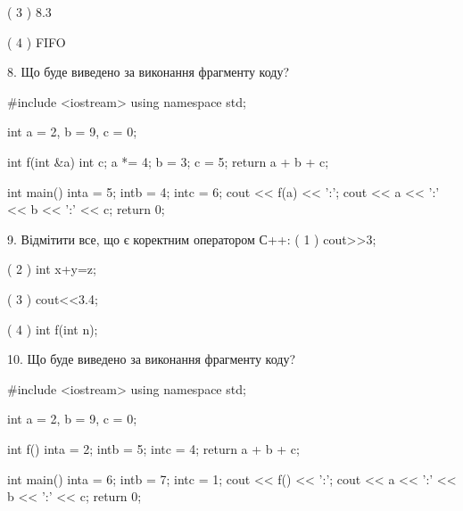 \documentclass[11pt, ukrainian]{article}
\begin{document}
\begin{large}
( 3 ) 8.3

( 4 ) FIFO


8. Що буде виведено за виконання фрагменту коду?

#include <iostream>
using namespace std;

int a = 2, b = 9, c = 0;

int f(int &a){
int c;    a *= 4;
    b = 3;
    c = 5;
    return a + b + c;
}

int main(){
    inta = 5;
    intb = 4;
    intc = 6;
    cout << f(a) << ':';
    cout << a << ':' << b << ':' << c;
    return 0; 
}


9. Відмітити все, що є коректним оператором С++:
( 1 ) cout>>3;

( 2 ) int x+y=z;

( 3 ) cout<<3.4;

( 4 ) int f(int n);


10. Що буде виведено за виконання фрагменту коду?

#include <iostream>
using namespace std;

int a = 2, b = 9, c = 0;

int f(){
    inta = 2;
    intb = 5;
    intc = 4;
    return a + b + c;
}

int main(){
    inta = 6;
    intb = 7;
    intc = 1;
    cout << f() << ':';
    cout << a << ':' << b << ':' << c;
    return 0;
}

\end{large}
\newpage
\end{document}
